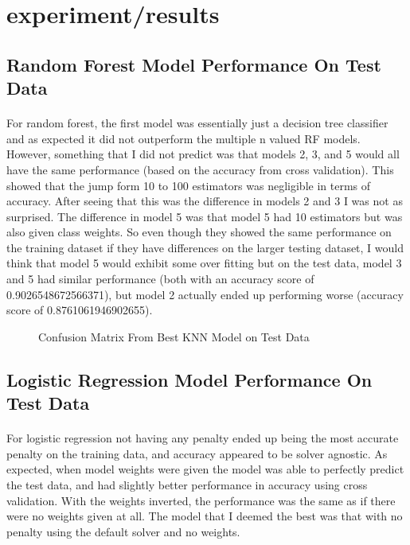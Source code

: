 \documentclass{article}
\begin{document}
\section{experiment/results}
\subsection{Random Forest Model Performance On Test Data}
\paragraph{} 
    For random forest, the first model was essentially just a decision tree classifier and as expected it did not outperform the multiple n valued RF models. However, something that I did not predict was that models 2, 3, and 5 would all have the same performance (based on the accuracy from cross validation). This showed that the jump form 10 to 100 estimators was negligible in terms of accuracy. After seeing that this was the difference in models 2 and 3 I was not as surprised. The difference in model 5 was that model 5 had 10 estimators but was also given class weights. So even though they showed the same performance on the training dataset if they have differences on the larger testing dataset, I would think that model 5 would exhibit some over fitting but on the test data, model 3 and 5 had similar performance (both with an accuracy score of 0.9026548672566371), but model 2 actually ended up performing worse (accuracy score of 0.8761061946902655).

    \begin{figure}[H]
      \centering
      \caption{Confusion Matrix From Best KNN Model on Test Data}
    \end{figure}

\subsection{Logistic Regression Model Performance On Test Data}
\paragraph{}
    For logistic regression not having any penalty ended up being the most accurate penalty on the training data, and accuracy appeared to be solver agnostic. As expected, when model weights were given the model was able to perfectly predict the test data, and had slightly better performance in accuracy using cross validation. With the weights inverted, the performance was the same as if there were no weights given at all. The model that I deemed the best was that with no penalty using the default solver and no weights.
    
\end{document}
